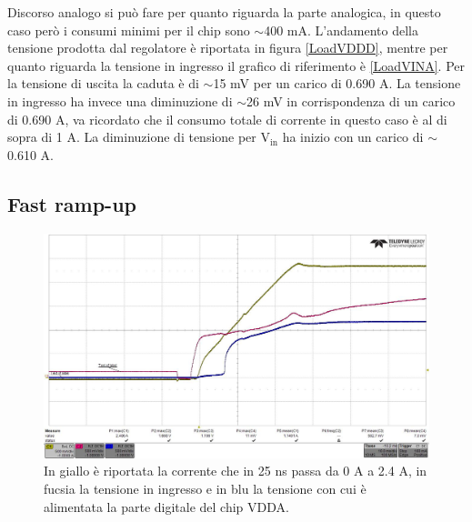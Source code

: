Discorso analogo si può fare per quanto riguarda la parte analogica, in questo caso però i consumi minimi per il chip sono $\sim$400 mA. L'andamento della tensione prodotta dal regolatore è riportata in figura \ref{LoadVDDD}, mentre per quanto riguarda la tensione in ingresso il grafico di riferimento è \ref{LoadVINA}. 
Per la tensione di uscita la caduta è di $\sim$15 mV per un carico di 0.690 A. %
La tensione in ingresso ha invece una diminuzione di $\sim$26 mV in corrispondenza di un carico di 0.690 A, va ricordato che il consumo totale di corrente in questo caso è al di sopra di 1 A. 
La diminuzione di tensione per $\mathrm{V_{in}}$ ha inizio con un carico di $\sim$0.610 A.

\subsection{Fast ramp-up}
\begin{figure}
\centering
\includegraphics[scale=.3]{Immagini/rd-powup-dir6}
\caption{In giallo è riportata la corrente che in 25 ns passa da 0 A a 2.4 A, in fucsia la tensione in ingresso e in blu la tensione con cui è alimentata la parte digitale del chip VDDA.}
\label{rd-powup-dir6}
\end{figure}

